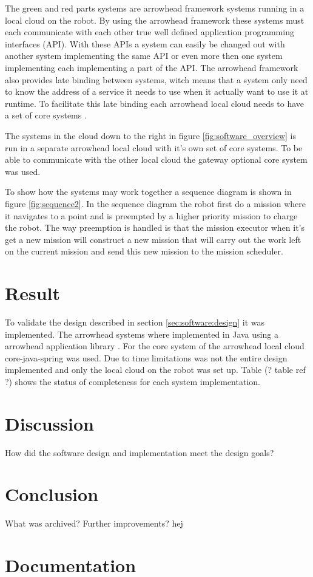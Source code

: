 \documentclass{article}
\begin{document}
The green and red parts systems are arrowhead framework systems \cite{delsing2017arrowhead} running in a local cloud on the robot. By using the arrowhead framework these systems must each communicate with each other true well defined application programming interfaces (API). With these APIs a system can easily be changed out with another system implementing the same API or even more then one system implementing each implementing a part of the API.
The arrowhead framework also provides late binding between systems, witch means that a system only need to know the address of a service it needs to use when it actually want to use it at runtime.
To facilitate this late binding each arrowhead local cloud needs to have a set of core systems \cite{varga2017making}.

The systems in the cloud down to the right in figure \ref{fig:software_overview} is run in a separate arrowhead local cloud with it's own set of core systems. To be able to communicate with the other local cloud the gateway optional core system \cite{varga2015service} was used.



To show how the systems may work together a sequence diagram is shown in figure \ref{fig:sequence2}.
In the sequence diagram the robot first do a mission where it navigates to a point and is preempted by a higher priority mission to charge the robot.
The way preemption is handled is that the mission executor when it's get a new mission will construct a new mission that will carry out the work left on the current mission and send this new mission to the mission scheduler.

\section{Result}
\label{sec:software:result}

To validate the design described in section \ref{sec:software:design} it was implemented.
The arrowhead systems where implemented in Java using a arrowhead application library \cite{arrowheadlib}.
For the core system of the arrowhead local cloud core-java-spring \cite{arrowheadcore} was used.
Due to time limitations was not the entire design implemented and only the local cloud on the robot was set up.
Table (? table ref ?) shows the status of completeness for each system implementation.

\section{Discussion}
How did the software design and implementation meet the design goals?

\section{Conclusion}
What was archived?
Further improvements?
hej

\printbibliography

\appendix
\section{Documentation}
\end{document}

